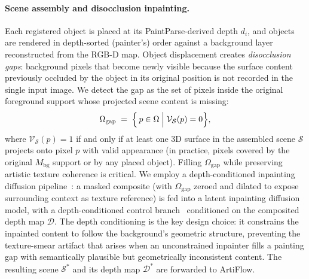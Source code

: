 \paragraph{Scene assembly and disocclusion inpainting.}
Each registered object is placed at its PaintParse-derived depth $d_i$,
and objects are rendered in depth-sorted (painter's) order against a
background layer reconstructed from the RGB-D map. Object displacement
creates \emph{disocclusion gaps}: background pixels that become newly
visible because the surface content previously occluded by the object
in its original position is not recorded in the single input image. We
detect the gap as the set of pixels inside the original foreground
support whose projected scene content is missing:
\begin{equation}
    \Omega_{\mathrm{gap}} \;=\;
    \Bigl\{\,p \in \Omega \;\Big|\;
        \mathcal{V}_{\mathcal{S}}(p) = 0 \Bigr\},
    \label{eq:gap}
\end{equation}
where $\mathcal{V}_{\mathcal{S}}(p) = 1$ if and only if at least one 3D
surface in the assembled scene $\mathcal{S}$ projects onto pixel $p$
with valid appearance (in practice, pixels covered by the original
$M_{\mathrm{bg}}$ support or by any placed object). Filling
$\Omega_{\mathrm{gap}}$ while preserving artistic texture coherence is
critical. We employ a depth-conditioned inpainting diffusion
pipeline~\cite{lugmayr2022repaint,rombach2022ldm}: a masked composite
(with $\Omega_{\mathrm{gap}}$ zeroed and dilated to expose surrounding
context as texture reference) is fed into a latent inpainting diffusion
model, with a depth-conditioned control
branch~\cite{zhang2023controlnet} conditioned on the composited depth
map $\mathcal{D}$. The depth
conditioning is the key design choice: it constrains the inpainted
content to follow the background's geometric structure, preventing the
texture-smear artifact that arises when an unconstrained inpainter
fills a painting gap with semantically plausible but geometrically
inconsistent content. The resulting scene $\mathcal{S}^{*}$ and its
depth map $\mathcal{D}^{*}$ are forwarded to ArtiFlow.

